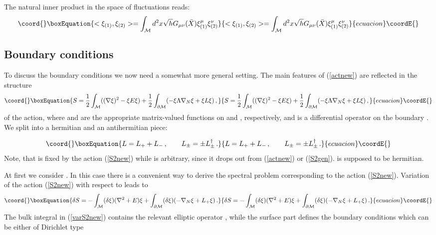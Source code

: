\documentclass[a4paper,12pt]{article}
\begin{document}
The natural inner product in the space of fluctuations reads:
\begin{equation}\coord{}\boxEquation{
<\xi_{(1)},\xi_{(2)}>=\int_{\cal M}d^2 x\sqrt{h} G_{\mu\nu} (\bar X)
\xi_{(1)}^\mu \xi_{(2)}^\nu
\label{innprod}
}{
<\xi_{(1)},\xi_{(2)}>=\int_{\cal M}d^2 x\sqrt{h} G_{\mu\nu} (\bar X)
\xi_{(1)}^\mu \xi_{(2)}^\nu
}{ecuacion}\coordE{}\end{equation}

\subsection{Boundary conditions}
\label{bcsection}
To discuss the boundary conditions we now need a somewhat 
more general setting. 
The main features of (\ref{actnew}) are reflected in the structure  
\begin{equation}\coord{}\boxEquation{
S=\frac 12 \int_{\cal M} ((\nabla \xi )^2 -\xi E \xi )
+\frac 12 \int_{\partial {\cal M}} 
(-\xi \Lambda \nabla_N \xi +\xi L \xi )\,,
\label{S2gen}
}{
S=\frac 12 \int_{\cal M} ((\nabla \xi )^2 -\xi E \xi )
+\frac 12 \int_{\partial {\cal M}} 
(-\xi \Lambda \nabla_N \xi +\xi L \xi )\,,
}{ecuacion}\coordE{}\end{equation}
of the action, where \coordHE{} and \myHighlight{$\Lambda$}\coordHE{} are the appropriate matrix-valued 
functions on \coordHE{} and \coordHE{}, respectively, and
\coordHE{} is a differential operator on the boundary \coordHE{}.
We split \coordHE{} into a hermitian and an antihermitian piece:  

\begin{equation}\coord{}\boxEquation{
L=L_++L_-\,,\qquad L_\pm =\pm L_\pm^\dag \,. \label{split}
}{
L=L_++L_-\,,\qquad L_\pm =\pm L_\pm^\dag \,. }{ecuacion}\coordE{}\end{equation}
Note, that \coordHE{} is fixed by the action (\ref{S2new}) while
\coordHE{} is arbitrary, since it drops out from 
(\ref{actnew}) or (\ref{S2gen}).  \coordHE{} is supposed to be hermitian.


At first we consider  \coordHE{}. In this case there is a convenient way to
derive the spectral problem corresponding to the action
(\ref{S2new}). Variation of the action (\ref{S2new}) with
respect to \myHighlight{$\xi$}\coordHE{} leads to 
\begin{equation}\coord{}\boxEquation{
\delta S=- \int_{\cal M}  (\delta\xi )(\nabla^2 +E)\xi
+\int_{\partial {\cal M}} (\delta\xi )
(-\nabla_N \xi +L_+\xi ) \,.\label{varS2new}
}{
\delta S=- \int_{\cal M}  (\delta\xi )(\nabla^2 +E)\xi
+\int_{\partial {\cal M}} (\delta\xi )
(-\nabla_N \xi +L_+\xi ) \,.}{ecuacion}\coordE{}\end{equation}
The bulk integral in (\ref{varS2new}) contains the relevant
elliptic operator \coordHE{}, while the surface
part defines the boundary conditions which can be either
of Dirichlet type
\end{document}
